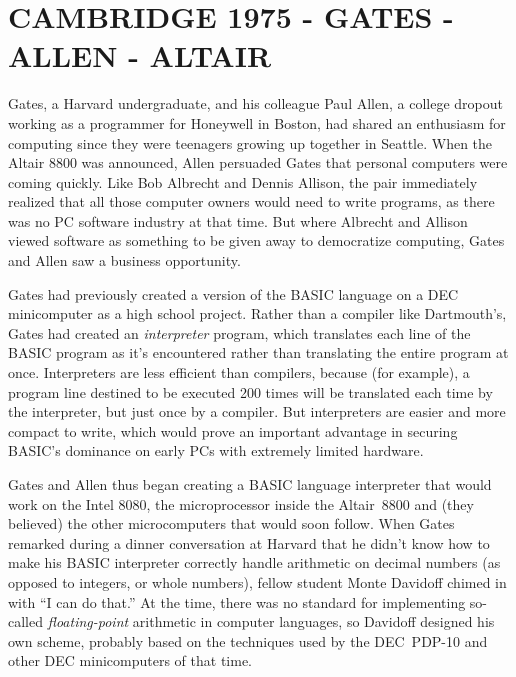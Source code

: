 
\section{CAMBRIDGE 1975 - GATES - ALLEN - ALTAIR}



Gates, a Harvard undergraduate, and his colleague Paul Allen, a
college dropout working as a programmer for Honeywell in Boston, had
shared an enthusiasm for computing since they were teenagers growing
up together in Seattle.
When the Altair 8800 was announced, Allen persuaded Gates that
personal computers were coming quickly.
Like Bob Albrecht and Dennis Allison, the pair immediately realized
that all those computer owners would need to write programs, as there
was no PC software industry at that time.
But where Albrecht and Allison viewed software as something to be
given away to democratize computing, Gates and Allen saw a business
opportunity.

Gates had previously created a version of the BASIC language on a DEC 
minicomputer as a high school project.  Rather than a compiler like
Dartmouth's, Gates had created an \emph{interpreter\/} program, which
translates each line of the BASIC program as it's encountered rather
than translating the entire program at once.  Interpreters are less
efficient than compilers, because (for example), a program line
destined to be executed 200 times will be translated each time by the
interpreter, but just once by a compiler.  But interpreters are easier
and more compact to write, which
would prove an important advantage in securing BASIC's dominance on
early PCs with extremely limited hardware.  

Gates and Allen thus began creating a BASIC language interpreter that
would work on the Intel 8080, the microprocessor inside the
Altair~8800 and (they believed) the other microcomputers
that would soon follow.
When Gates remarked during a dinner conversation at Harvard that he
didn't know how to make his BASIC interpreter correctly handle
arithmetic on decimal numbers (as opposed to integers, or whole numbers),
fellow student Monte
Davidoff chimed in with ``I can do that.''
At the time, there was no standard for implementing so-called
\emph{floating-point\/} arithmetic in
computer languages, so Davidoff designed his own scheme, probably
based on the techniques used by the DEC~PDP-10 and other DEC
minicomputers of that time.


